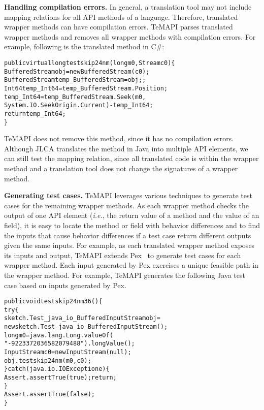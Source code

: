 \textbf{Handling compilation errors.} In general, a translation tool may not include mapping relations for all API methods of a language. Therefore, translated wrapper methods can have compilation errors. TeMAPI parses translated wrapper methods and removes all wrapper methods with compilation errors. For example, following is the translated  method in C\#:

\begin{CodeOut}\vspace*{-1ex}
\begin{alltt}
public virtual long testskip24nm(long m0, Stream c0)\{
  BufferedStream obj = new BufferedStream(c0);
  BufferedStream temp_BufferedStream = obj;;
  Int64 temp_Int64 = temp_BufferedStream.Position;
  temp_Int64 = temp_BufferedStream.Seek(m0,
        System.IO.SeekOrigin.Current) - temp_Int64;
  return temp_Int64;
\}
\end{alltt}
\end{CodeOut}\vspace*{-2ex}

TeMAPI does not remove this method, since it has no compilation errors. Although JLCA translates the  method in Java into multiple API elements, we can still test the mapping relation, since all translated code is within the wrapper method and a translation tool does not change the signatures of a wrapper method.

\textbf{Generating test cases.} TeMAPI leverages various techniques to generate test cases for the remaining wrapper methods. As each wrapper method checks the output of one API element (\emph{i.e.}, the return value of a method and the value of an field), it is easy to locate the method or field with behavior differences and to find the inputs that cause behavior differences if a test case return different outputs given the same inputs. For example, as each translated wrapper method exposes its inputs and output, TeMAPI extends Pex~\cite{tillmann2008pex} to generate test cases for each wrapper method. Each input generated by Pex exercises a unique feasible path in the wrapper method. For example, TeMAPI generates the following Java test case based on inputs generated by Pex.

\begin{CodeOut}\vspace*{-1ex}
\begin{alltt}
public void testskip24nm36()\{
  try\{
     sketch.Test_java_io_BufferedInputStream obj =
        new sketch.Test_java_io_BufferedInputStream();
     long m0 = java.lang.Long.valueOf(
                  "-9223372036582079488").longValue();
     InputStream c0 = new InputStream(null);
     obj.testskip24nm(m0,c0);
  \}catch(java.io.IOException e)\{
     Assert.assertTrue(true);return;
  \}
  Assert.assertTrue(false);
\}
\end{alltt}
\end{CodeOut}\vspace*{-2ex}

